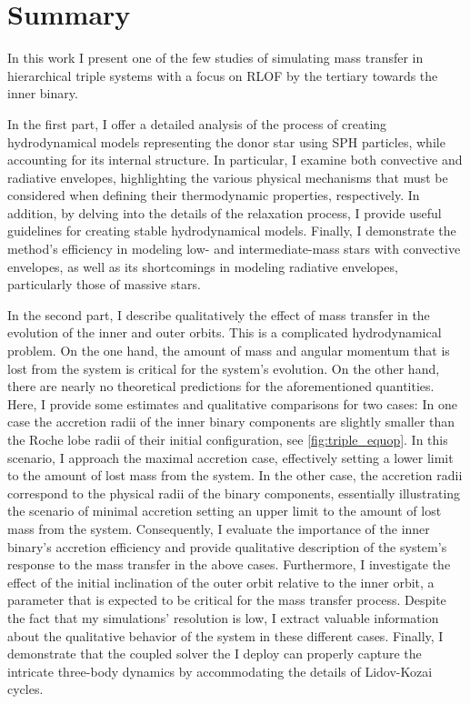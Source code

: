 \section{Summary}

In this work I present one of the few studies of simulating mass transfer in hierarchical triple systems with a focus on RLOF by the tertiary towards the inner binary. 

In the first part, I offer a detailed analysis of the process of creating hydrodynamical models representing the donor star using SPH particles, while accounting for its internal structure. In particular, I examine both convective and radiative envelopes, highlighting the various physical mechanisms that must be considered when defining their thermodynamic properties, respectively. In addition, by delving into the details of the relaxation process, I provide useful guidelines for creating stable hydrodynamical models. Finally, I demonstrate the method's efficiency in modeling low- and intermediate-mass stars with convective envelopes, as well as its shortcomings in modeling radiative envelopes, particularly those of massive stars.

In the second part, I describe qualitatively the effect of mass transfer in the evolution of the inner and outer orbits. This is a complicated hydrodynamical problem. On the one hand, the amount of mass and angular momentum that is lost from the system is critical for the system's evolution. On the other hand, there are nearly no theoretical predictions for the aforementioned quantities. Here, I provide some estimates and qualitative comparisons for two cases: In one case the accretion radii of the inner binary components are slightly smaller than the Roche lobe radii of their initial configuration, see \cref{fig:triple_equop}. In this scenario, I approach the maximal accretion case, effectively setting a lower limit to the amount of lost mass from the system. In the other case, the accretion radii correspond to the physical radii of the binary components, essentially illustrating the scenario of minimal accretion setting an upper limit to the amount of lost mass from the system. Consequently, I evaluate the importance of the inner binary's accretion efficiency and provide qualitative description of the system's response to the mass transfer in the above cases. Furthermore, I investigate the effect of the initial inclination of the outer orbit relative to the inner orbit, a parameter that is expected to be critical for the mass transfer process. Despite the fact that my simulations' resolution is low, I extract valuable information about the qualitative behavior of the system in these different cases. Finally, I demonstrate that the coupled solver the I deploy can properly capture the intricate three-body dynamics by accommodating the details of Lidov-Kozai cycles. 


